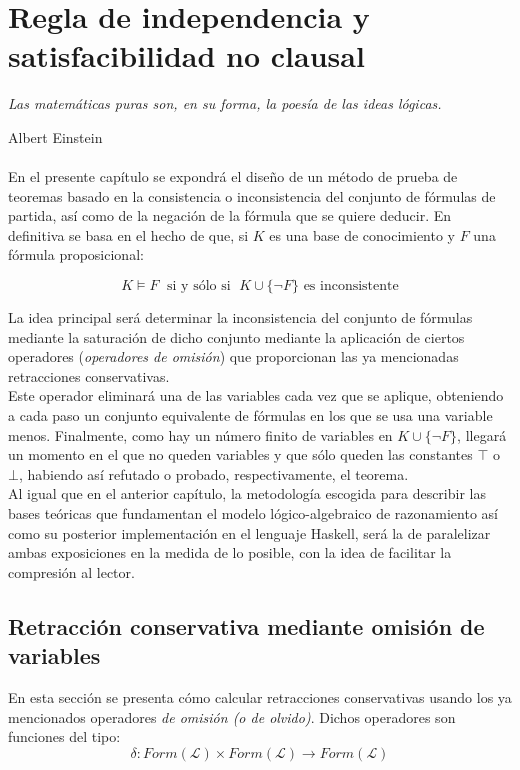 \chapter{Regla de independencia y satisfacibilidad no clausal}


\hfil \textit{Las matemáticas puras son, en su forma, la poesía de las ideas lógicas.}

\hfil \hfil \hfil Albert Einstein \\\\


En el presente capítulo se expondrá el diseño de un método de prueba de teoremas basado en la consistencia o inconsistencia del conjunto de fórmulas de partida, así como de la negación de la fórmula que se quiere deducir. En definitiva se basa en el hecho de que, si $K$ es una base de conocimiento y $F$ una fórmula proposicional:

$$K\vDash F \;\text{ si y sólo si }\; K \cup \{ \neg F \} \text{ es inconsistente}$$

La idea principal será determinar la inconsistencia del conjunto de fórmulas mediante la saturación de dicho conjunto mediante la aplicación de ciertos operadores (\textit{operadores de omisión}) que proporcionan las ya mencionadas retracciones conservativas. \\

Este operador eliminará una de las variables cada vez que se aplique, obteniendo a cada paso un conjunto equivalente de fórmulas en los que se usa una variable menos. Finalmente, como hay un número finito de variables en $K \cup \{ \neg F \} $, llegará un momento en el que no queden variables y que sólo queden las constantes $\top$ o $\bot$, habiendo así refutado o probado, respectivamente, el teorema.\\

Al igual que en el anterior capítulo, la metodología escogida para describir las bases teóricas que fundamentan el modelo lógico-algebraico de razonamiento así como su posterior implementación en el lenguaje Haskell, será la de paralelizar ambas exposiciones en la medida de lo posible, con la idea de facilitar la compresión al lector.


\section{Retracción conservativa mediante omisión de variables}
En esta sección se presenta cómo calcular retracciones conservativas usando los ya mencionados operadores \textit{de omisión (o de olvido)}. Dichos operadores son funciones del tipo:
$$\delta : Form(\mathcal{L}) \times Form(\mathcal{L}) \longrightarrow Form(\mathcal{L}) $$

